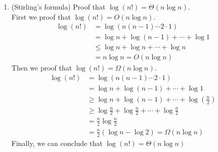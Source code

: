 \documentclass[11pt]{article}
\begin{document}
\begin{enumerate}
\begin{enumerate}
\item (Stirling's formula) Proof that $\log(n!) = \Theta (n \log n)$.\\
First we proof that $\log (n!) = O(n \log n)$.
\begin{align*}
\log (n!) &= \log (n (n-1) \cdots 2 \cdot 1)\\ 
&= \log n + \log (n-1) + \cdots + \log 1 \\
&\leq \log n + \log n + \cdots + \log n \\
&= n \log n = O(n \log n)
\end{align*}
Then we proof that $\log (n!) = \Omega (n \log n)$.
\begin{align*}
\log (n!) &= \log (n (n-1) \cdots 2 \cdot 1)\\ 
&= \log n + \log (n-1) + \cdots + \log 1 \\
&\geq \log n + \log (n-1) + \cdots + \log (\frac{n}{2}) \\
&\geq \log \frac{n}{2} + \log \frac{n}{2} + \cdots + \log \frac{n}{2}\\
&= \frac{n}{2} \log \frac{n}{2}\\
&= \frac{n}{2} (\log n -\log 2) = \Omega(n \log n)
\end{align*}
Finally, we can conclude that $\log (n!) = \Theta (n \log n)$
\end{enumerate}
\end{enumerate}
\end{document}

